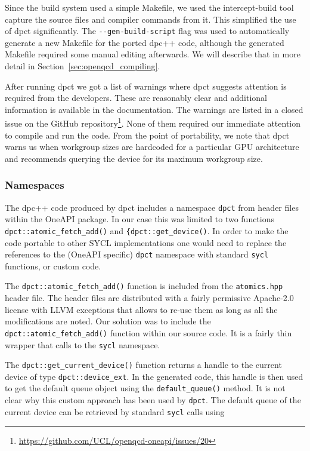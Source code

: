 \documentclass[../main]{subfiles}
\begin{document}
Since the build system used a simple Makefile, we used the intercept-build tool capture the source files and compiler commands from it.
This simplified the use of dpct significantly.
The \verb !--gen-build-script! flag was used to automatically generate a new Makefile for the ported dpc++ code, although the generated Makefile required some manual editing afterwards.
We will describe that in more detail in Section~\ref{sec:openqcd_compiling}.

After running dpct we got a list of warnings where dpct suggests attention is required from the developers.
These are reasonably clear and additional information is available in the documentation.
The warnings are listed in a closed issue on the GitHub repository\footnote{\url{https://github.com/UCL/openqcd-oneapi/issues/20}}.
None of them required our immediate attention to compile and run the code.
From the point of portability, we note that dpct warns us when workgroup sizes are hardcoded for a particular GPU architecture and recommends querying the device for its maximum workgroup size.

\subsubsection{Namespaces}\label{sec:openqcd_namespaces}

The dpc++ code produced by dpct includes a namespace \texttt{dpct} from header files within the OneAPI package.
In our case this was limited to two functions \verb!dpct::atomic_fetch_add()! and \verb!{dpct::get_device()!.
In order to make the code portable to other SYCL implementations one would need to replace the references to the (OneAPI specific) \texttt{dpct} namespace with standard \texttt{sycl} functions, or custom code.

The \verb!dpct::atomic_fetch_add()! function is included from the \texttt{atomics.hpp} header file.
The header files are distributed with a fairly permissive Apache-2.0 license with LLVM exceptions that allows to re-use them as long as all the modifications are noted.
Our solution was to include the \verb!dpct::atomic_fetch_add()! function within our source code.
It is a fairly thin wrapper that calls to the \texttt{sycl} namespace.

The \verb!dpct::get_current_device()! function returns a handle to the current device of type \verb #dpct::device_ext#. In the generated code, this handle is then used to get the default queue object using the \verb #default_queue()# method. It is not clear why this custom approach has been used by \texttt{dpct}. The default queue of the current device can be retrieved by standard \texttt{sycl} calls using
\end{document}

